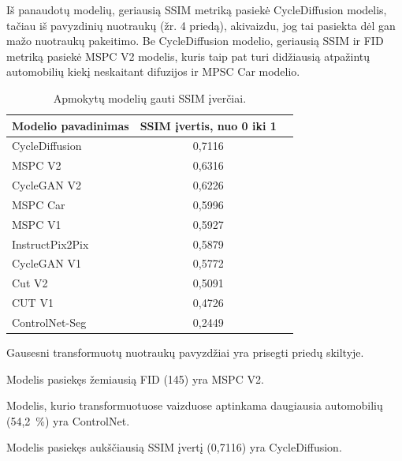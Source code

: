 \documentclass{VUMIFPSbakalaurinis}
\begin{document}
            Iš panaudotų modelių, geriausią SSIM metriką pasiekė CycleDiffusion modelis, tačiau iš pavyzdinių nuotraukų (žr. 4 priedą), akivaizdu, jog tai pasiekta dėl gan mažo nuotraukų pakeitimo. Be CycleDiffusion modelio, geriausią SSIM ir FID metriką pasiekė MSPC V2 modelis, kuris taip pat turi didžiausią atpažintų automobilių kiekį neskaitant difuzijos ir MPSC Car modelio.

        
            \begin{table}[H]
                \footnotesize
                \centering
                \caption{Apmokytų modelių gauti SSIM įverčiai.}
                {\begin{tabular}{|l|c|c|} \hline
                    Modelio pavadinimas & SSIM įvertis, nuo 0 iki 1\\
                    \hline
                    CycleDiffusion & 0,7116 \\ %
                    MSPC V2 & 0,6316 \\
                    CycleGAN V2 & 0,6226 \\
                    MSPC Car & 0,5996 \\ %
                    MSPC V1 & 0,5927 \\
                    InstructPix2Pix & 0,5879 \\ %
                    CycleGAN V1 & 0,5772 \\
                    Cut V2 & 0,5091\\ 
                    CUT V1 & 0,4726 \\
                    ControlNet-Seg & 0,2449 \\ %
                    \hline
                    \end{tabular}
                }
                \label{tab:table example}
            \end{table}
    
    Gausesni transformuotų nuotraukų pavyzdžiai yra prisegti priedų skiltyje.
    
    Modelis pasiekęs žemiausią FID (145) yra MSPC V2. 
    
    Modelis, kurio transformuotuose vaizduose aptinkama daugiausia automobilių (54,2~\%) yra ControlNet.
    
    Modelis pasiekęs aukščiausią SSIM įvertį (0,7116) yra CycleDiffusion.
    
\end{document}
